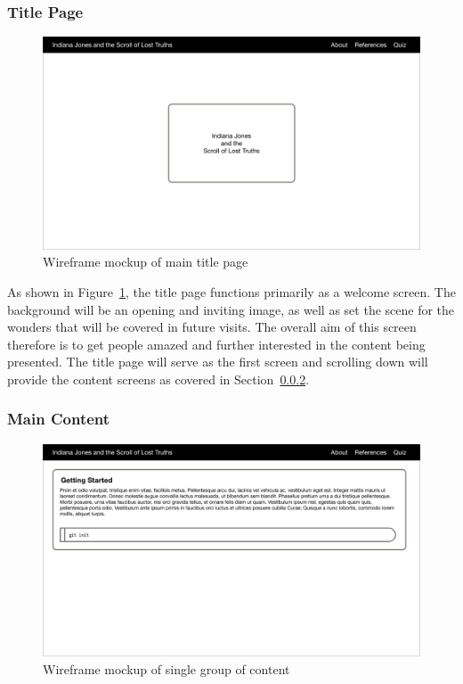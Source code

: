 \subsubsection{Title Page}
\begin{figure}
	\centering
	\includegraphics[width=0.9\linewidth]{wireframe/web1}	
	\caption{Wireframe mockup of main title page}\label{fig:wtitle}
\end{figure}
As shown in Figure~\ref{fig:wtitle}, the title page functions primarily as a welcome screen. The background will be an opening and inviting image, as well as set the scene for the wonders that will be covered in future visits. The overall aim of this screen therefore is to get people amazed and further interested in the content being presented. The title page will serve as the first screen and scrolling down will provide the content screens as covered in Section~\ref{sec:wcontent}.

\subsubsection{Main Content}\label{sec:wcontent}
\begin{figure}
	\centering
	\includegraphics[width=0.9\linewidth]{wireframe/web2}	
	\caption{Wireframe mockup of single group of content}\label{fig:wcontent}
\end{figure}


